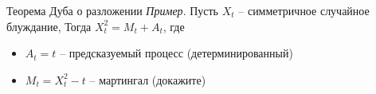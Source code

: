 \documentclass{beamer}
\begin{document}
\begin{frame}{Теорема Дуба о разложении}
    \textit{Пример}. Пусть $X_t$ -- симметричное случайное блуждание, Тогда $X_t^2 = M_t + A_t$, где 
    \begin{itemize}
        \item $A_t = t$ -- предсказуемый процесс (детерминированный)
        \item $M_t = X_t^2 - t$ -- мартингал (докажите) 
    \end{itemize}
\end{frame}
\end{document}
